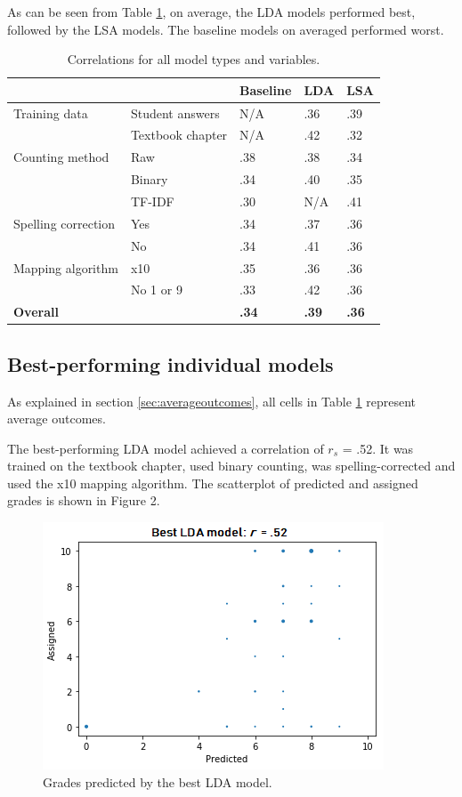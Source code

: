 \documentclass[a4paper,10pt,twoside]{article}
\begin{document}
As can be seen from Table \ref{table1}, on average, the LDA models performed best, followed by the LSA models. The baseline models on averaged performed worst.

\begin{table}
\caption{Correlations for all model types and variables.}
\label{table1}
\centering
\begin{tabular}{lllll}
	\hline  &  & \textbf{Baseline} & \textbf{LDA} & \textbf{LSA} \\ 
	\hline  Training data & Student answers & N/A & .36 & .39 \\ 
						 & Textbook chapter & N/A & .42 & .32 \\ 
	\hline  Counting method & Raw & .38 & .38 & .34 \\ 
							& Binary & .34 & .40 & .35 \\ 
							& TF-IDF & .30 & N/A & .41 \\ 
	\hline  Spelling correction & Yes & .34 & .37 & .36 \\ 
								& No & .34 & .41 & .36 \\ 
	\hline  Mapping algorithm & x10 & .35 & .36 & .36 \\ 
							  & No 1 or 9 & .33 & .42 & .36 \\ 
	\hline  \textbf{Overall} &  & \textbf{.34} & \textbf{.39} & \textbf{.36} \\ 
	\hline 
	\end{tabular} 
\end{table}

\subsection{Best-performing individual models}
As explained in section \ref{sec:averageoutcomes}, all cells in Table \ref{table1} represent average outcomes.

The best-performing LDA model achieved a correlation of $\textit{r}_s$ = .52. It was trained on the textbook chapter, used binary counting, was spelling-corrected and used the x10 mapping algorithm. The scatterplot of predicted and assigned grades is shown in Figure 2.

\begin{figure}
\centering
\includegraphics[width=0.5\linewidth]{"Best LDA model"}
\caption{Grades predicted by the best LDA model.}
\label{lda}
\end{figure}
\end{document}
